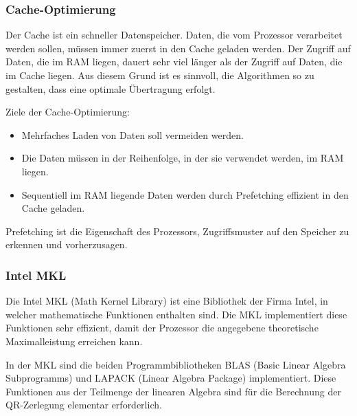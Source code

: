 \subsubsection{Cache-Optimierung}
Der Cache ist ein schneller Datenspeicher. Daten, die vom Prozessor verarbeitet werden sollen, müssen immer zuerst in den Cache geladen werden.
Der Zugriff auf Daten, die im RAM liegen, dauert sehr viel länger als der Zugriff auf Daten, die im Cache liegen.
Aus diesem Grund ist es sinnvoll, die Algorithmen so zu gestalten, dass eine optimale Übertragung erfolgt.

Ziele der Cache-Optimierung:
\begin{itemize}
	\item Mehrfaches Laden von Daten soll vermeiden werden.
	\item Die Daten müssen in der Reihenfolge, in der sie verwendet werden, im RAM liegen.
	\item Sequentiell im RAM liegende Daten werden durch Prefetching effizient in den Cache geladen.
\end{itemize}

Prefetching ist die Eigenschaft des Prozessors, Zugriffsmuster auf den Speicher zu erkennen und vorherzusagen.	

\subsubsection{Intel MKL}
Die Intel MKL (Math Kernel Library) \cite{mkl} ist eine Bibliothek der Firma Intel, in welcher mathematische Funktionen enthalten sind.
Die MKL implementiert diese Funktionen sehr effizient, damit der Prozessor die angegebene theoretische Maximalleistung erreichen kann.



In der MKL sind die beiden Programmbibliotheken BLAS (Basic Linear Algebra Subprogramms) und LAPACK (Linear Algebra Package) implementiert. 
Diese Funktionen aus der Teilmenge der linearen Algebra sind für die Berechnung der QR-Zerlegung elementar erforderlich.

